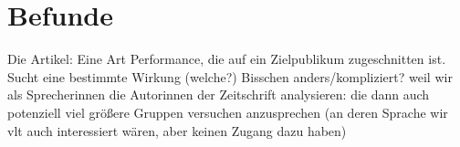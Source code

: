 \section{Befunde}


Die Artikel: Eine Art Performance, die auf ein Zielpublikum zugeschnitten ist.
Sucht eine bestimmte Wirkung (welche?)
Bisschen anders/kompliziert? weil wir als Sprecherinnen die Autorinnen der Zeitschrift analysieren: die dann auch potenziell viel größere Gruppen versuchen anzusprechen (an deren Sprache wir vlt auch interessiert wären, aber keinen Zugang dazu haben)
